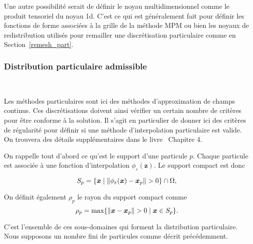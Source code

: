 Une autre possibilité serait de définir le noyau multidimensionnel comme le produit tensoriel du noyau 1d. C'est ce qui est généralement fait pour définir les fonctions de forme associées à la grille de la méthode MPM ou bien les noyaux de redistribution utilisés pour remailler une discrétisation particulaire comme en Section~\ref{remesh_part}.

\subsubsection{Distribution particulaire admissible}~\label{sec:part_admissible}

Les méthodes particulaires sont ici des méthodes d'approximation de champs continus. Ces discrétisations doivent ainsi vérifier un certain nombre de critères pour être conforme à la solution. Il s'agit en particulier de donner ici des critères de régularité pour définir si une méthode d'interpolation particulaire est valide. On trouvera des détails supplémentaires dans le livre~\cite{s_li_meshfree_2004} Chapitre 4.

On rappelle tout d'abord ce qu'est le support d'une particule $p$. Chaque particule est associée à une fonction d'interpolation $\phi_\varepsilon(\bm{z})$. Le support compact est donc

\begin{equation*}
    S_p = \{\bm{x} \mid \| \phi_\varepsilon (\bm{x}) - \bm{x}_p \| > 0\} \cap \Omega,
\end{equation*}

On définit également $\rho_p$ le rayon du support compact comme
\begin{equation*}
    \rho_p =  \max \{\| \bm{x} - \bm{x}_p \| > 0 \mid \bm{x} \in S_p\}.
\end{equation*}

C'est l'ensemble de ces sous-domaines qui forment la distribution particulaire. Nous supposons un nombre fini de particules comme décrit précédemment.%

